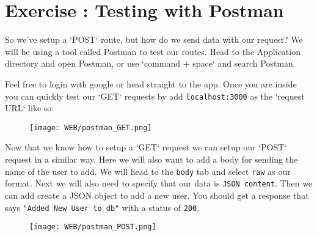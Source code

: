 \documentclass{42-en}
\begin{document}
\chapter{Exercise \exercicenumber: Testing with Postman}

    So we've setup a `POST` route, but how do we send data with our request? We will be using a tool called Postman to test our routes. Head to the Application directory and open Postman, or use  `command + space` and search Postman.

    Feel free to login with google or head straight to the app. Once you are inside you can quickly test our `GET` requests by add \texttt{localhost:3000} as the `request URL` like so:

    \begin{figure}[H]
        \begin{center}
            \texttt{[image: WEB/postman\_GET.png]}
        \end{center}
    \end{figure}

Now that we know how to setup a `GET` request we can setup our `POST` request in a similar way. Here we will also want to add a body for sending the name of the user to add. We will head to the \texttt{body} tab and select \texttt{raw} as our format. Next we will also need to specify that our data is \texttt{JSON content}. Then we can add create a JSON object to add a new user. You should get a response that says \texttt{"Added New User to db"} with a status of \texttt{200}.

    \begin{figure}[H]
        \begin{center}
            \texttt{[image: WEB/postman\_POST.png]}
        \end{center}
    \end{figure}

\end{document}
